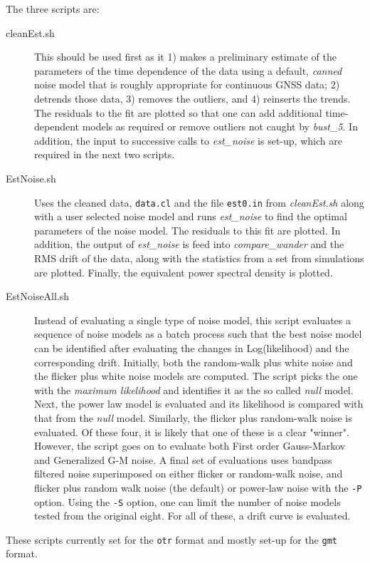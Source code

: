\documentclass[12pt]{amsart}
\begin{document}
The three scripts are:
\begin{description}
\item[cleanEst.sh] This should be used first as it 1) makes a preliminary estimate of the parameters of the time dependence of the 
data using a default, \textit{canned} noise model that is roughly appropriate for continuous GNSS data; 2) detrends those data, 3) removes the outliers, and 4) reinserts the trends. The residuals to the fit are plotted so that one can
add additional time-dependent models as required or remove outliers not caught by \textit{bust\_5}.   In addition, the input to successive calls to \textit{est\_noise} is set-up, which are required in the next two scripts. 
\item[EstNoise.sh]  Uses the cleaned data, \texttt{data.cl} and the file \texttt{est0.in} from \textit{cleanEst.sh} along with a user selected noise
model and runs \textit{est\_noise} to find the optimal parameters of the noise model.  The residuals to this fit are plotted.
In addition, the output of \textit{est\_noise} is feed into \textit{compare\_wander} and the RMS drift of the data, along with
the statistics from a set from simulations are plotted.  Finally, the equivalent power spectral density is plotted.
\item[EstNoiseAll.sh]  Instead of evaluating a single type of noise model, this script evaluates a sequence of noise models
as a batch process such that the best noise model can be identified after evaluating the changes in Log(likelihood) and
the corresponding drift.  Initially, both the random-walk plus white noise and the flicker plus white noise models are
computed.  The script picks the one with the \textit{maximum likelihood} and identifies it as the so called \textit{null} model.
Next, the power law model is evaluated and its likelihood is compared with that from the \textit{null} model. Similarly,
the flicker plus random-walk noise is evaluated. Of these four, it is likely that one of these is a clear "winner". However,
the script goes on to evaluate both First order Gauss-Markov and Generalized G-M noise. A final set of evaluations uses
bandpass filtered noise superimposed on either flicker or random-walk noise, and flicker plus random walk noise (the default) or power-law noise with the \texttt{-P} option.  Using the \texttt{-S} option,
one can limit the number of noise models tested from the original eight. For all of these, a drift curve is evaluated.
\end{description}
These scripts currently set for the \texttt{otr} format and mostly set-up for
the \texttt{gmt} format.
\end{document}
